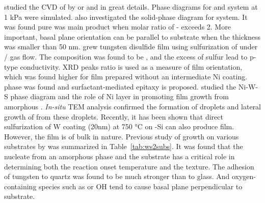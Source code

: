 \citeauthor{Lee1994} studied the CVD of  by  or  and  in great details. Phase diagrams for  and  system at 1 kPa were simulated.\cite{Lee1994} \citeauthor{Endler1999} also investigated the solid-phase diagram for  system.\cite{Endler1999} It was found pure  was main product when molar ratio of - exceeds 2. More important,  basal plane orientation can be parallel to substrate when the thickness was smaller than 50 nm. \citeauthor{Ennaoui1995a} grew tungsten disulfide film using sulfurization of  under / gas flow.\cite{Ennaoui1995a} The composition was found to be , and the excess of sulfur lead to p-type conductivity. XRD peaks ratio is used as a measure of film orientation, which was found higher for film prepared without an intermediate Ni coating.  phase was found and surfactant-mediated epitaxy is proposed. \citeauthor{Regula1997} studied the Ni-W-S phase diagram and the role of Ni layer in promoting  film growth from amorphous .\cite{Regula1997} \emph{In-situ} TEM analysis confirmed the formation of  droplets and lateral growth of  from these droplets.\cite{Regula1998} Recently, it has been shown that direct sulfurization of W coating (20nm) at 750 \si{\degreeCelsius} on -Si can also produce  film.\cite{Shanmugam2012a} However, the film is of bulk in nature. Previous study of  growth on various substrates by \citeauthor{Genut1992} was summarized in Table~\ref{tab:ws2subs}.\cite{Genut1992} It was found that the  nucleate from an amorphous  phase and the substrate has a critical role in determining both the reaction onset temperature and the texture. The adhesion of tungsten to quartz was found to be much stronger than to glass. And oxygen-containing species such as  or OH tend to cause  basal plane perpendicular to substrate.

